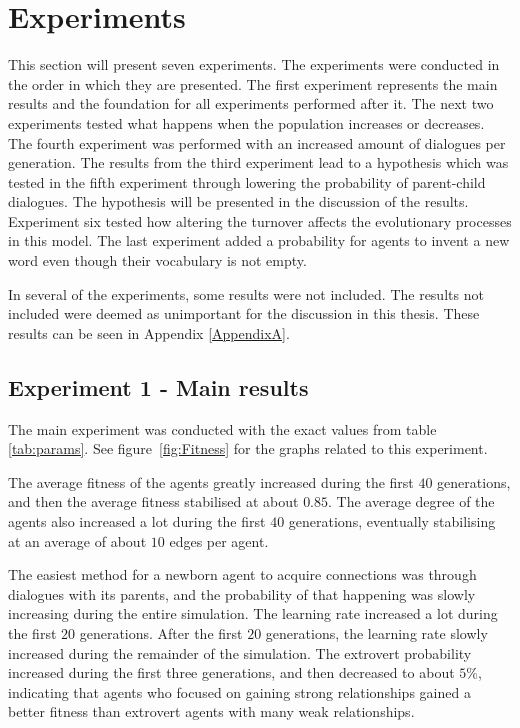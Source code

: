 \section{Experiments}
This section will present seven experiments. The experiments were conducted in the order in which they are presented. The first experiment represents the main results and the foundation for all experiments performed after it. The next two experiments tested what happens when the population increases or decreases. The fourth experiment was performed with an increased amount of dialogues per generation. The results from the third experiment lead to a hypothesis which was tested in the fifth experiment through lowering the probability of parent-child dialogues. The hypothesis will be presented in the discussion of the results. Experiment six tested how altering the turnover affects the evolutionary processes in this model. The last experiment added a probability for agents to invent a new word even though their vocabulary is not empty.

In several of the experiments, some results were not included. The results not included were deemed as unimportant for the discussion in this thesis. These results can be seen in Appendix \ref{AppendixA}.

\subsection{Experiment 1 - Main results}
The main experiment was conducted with the exact values from table \ref{tab:params}. See figure~\ref{fig:Fitness} for the graphs related to this experiment.

The average fitness of the agents greatly increased during the first $40$ generations, and then the average fitness stabilised at about $0.85$. The average degree of the agents also increased a lot during the first $40$ generations, eventually stabilising at an average of about $10$ edges per agent. 

The easiest method for a newborn agent to acquire connections was through dialogues with its parents, and the probability of that happening was slowly increasing during the entire simulation. The learning rate increased a lot during the first $20$ generations. After the first $20$ generations, the learning rate slowly increased during the remainder of the simulation. The extrovert probability increased during the first three generations, and then decreased to about $5\%$, indicating that agents who focused on gaining strong relationships gained a better fitness than extrovert agents with many weak relationships. 

